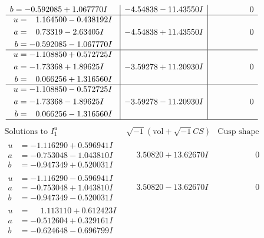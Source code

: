 \documentclass[1p]{elsarticle_modified}
\theoremstyle{definition}
\newcommand{\I}{\sqrt{-1}}
\begin{document}
$$\begin{array}{c|c|c}
\begin{aligned}
b &= -0.592085 + 1.067770 I\end{aligned}
 & -4.54838 - 11.43550 I & \phantom{-0.000000 } 0 \\ \hline\begin{aligned}
u &= \phantom{-}1.164500 - 0.438192 I \\
a &= \phantom{-}0.73319 - 2.63405 I \\
b &= -0.592085 - 1.067770 I\end{aligned}
 & -4.54838 + 11.43550 I & \phantom{-0.000000 } 0 \\ \hline\begin{aligned}
u &= -1.108850 + 0.572725 I \\
a &= -1.73368 + 1.89625 I \\
b &= \phantom{-}0.066256 + 1.316560 I\end{aligned}
 & -3.59278 + 11.20930 I & \phantom{-0.000000 } 0 \\ \hline\begin{aligned}
u &= -1.108850 - 0.572725 I \\
a &= -1.73368 - 1.89625 I \\
b &= \phantom{-}0.066256 - 1.316560 I\end{aligned}
 & -3.59278 - 11.20930 I & \phantom{-0.000000 } 0\\
 \hline 
 \end{array}$$\newpage$$\begin{array}{c|c|c}  
\text{Solutions to }I^u_{1}& \I (\text{vol} + \sqrt{-1}CS) & \text{Cusp shape}\\
 \hline 
\begin{aligned}
u &= -1.116290 + 0.596941 I \\
a &= -0.753048 - 1.043810 I \\
b &= -0.947349 + 0.520031 I\end{aligned}
 & \phantom{-}3.50820 + 13.62670 I & \phantom{-0.000000 } 0 \\ \hline\begin{aligned}
u &= -1.116290 - 0.596941 I \\
a &= -0.753048 + 1.043810 I \\
b &= -0.947349 - 0.520031 I\end{aligned}
 & \phantom{-}3.50820 - 13.62670 I & \phantom{-0.000000 } 0 \\ \hline\begin{aligned}
u &= \phantom{-}1.113110 + 0.612423 I \\
a &= -0.512604 + 0.329161 I \\
b &= -0.624648 - 0.696799 I\end{aligned}

\end{array}$$
\end{document}
